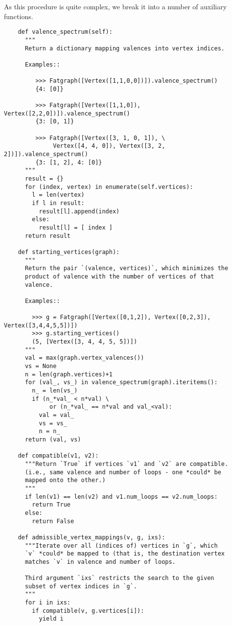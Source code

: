 As this procedure is quite complex, we break it into a
number of auxiliary functions.
\begin{lstlisting}
    def valence_spectrum(self):
      """
      Return a dictionary mapping valences into vertex indices.

      Examples::

         >>> Fatgraph([Vertex([1,1,0,0])]).valence_spectrum()
         {4: [0]}

         >>> Fatgraph([Vertex([1,1,0]), Vertex([2,2,0])]).valence_spectrum()
         {3: [0, 1]}

         >>> Fatgraph([Vertex([3, 1, 0, 1]), \
              Vertex([4, 4, 0]), Vertex([3, 2, 2])]).valence_spectrum()
         {3: [1, 2], 4: [0]}
      """
      result = {}
      for (index, vertex) in enumerate(self.vertices):
        l = len(vertex)
        if l in result:
          result[l].append(index)
        else:
          result[l] = [ index ]
      return result

    def starting_vertices(graph):
      """
      Return the pair `(valence, vertices)`, which minimizes the
      product of valence with the number of vertices of that
      valence.

      Examples::

        >>> g = Fatgraph([Vertex([0,1,2]), Vertex([0,2,3]), Vertex([3,4,4,5,5])])
        >>> g.starting_vertices()
        (5, [Vertex([3, 4, 4, 5, 5])])
      """
      val = max(graph.vertex_valences())
      vs = None
      n = len(graph.vertices)+1
      for (val_, vs_) in valence_spectrum(graph).iteritems():
        n_ = len(vs_)
        if (n_*val_ < n*val) \
             or (n_*val_ == n*val and val_<val):
          val = val_
          vs = vs_
          n = n_
      return (val, vs)

    def compatible(v1, v2):
      """Return `True` if vertices `v1` and `v2` are compatible.
      (i.e., same valence and number of loops - one *could* be
      mapped onto the other.)
      """
      if len(v1) == len(v2) and v1.num_loops == v2.num_loops:
        return True
      else:
        return False
        
    def admissible_vertex_mappings(v, g, ixs):
      """Iterate over all (indices of) vertices in `g`, which
      `v` *could* be mapped to (that is, the destination vertex
      matches `v` in valence and number of loops.

      Third argument `ixs` restricts the search to the given
      subset of vertex indices in `g`.
      """
      for i in ixs:
        if compatible(v, g.vertices[i]):
          yield i


\end{lstlisting}
